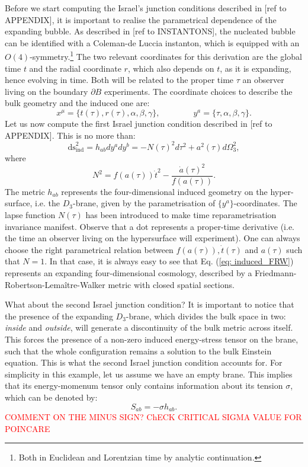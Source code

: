 \documentclass[12pt, a4paper]{article} %
\begin{document}
Before we start computing the Israel's junction conditions described in [ref to APPENDIX], it is important to realise the parametrical dependence of the expanding bubble. As described in [ref to INSTANTONS], the nucleated bubble can be identified with a Coleman-de Luccia instanton, which is equipped with an $O(4)$-symmetry.\footnote{Both in Euclidean and Lorentzian time by analytic continuation.} The two relevant coordinates for this derivation are the global time $t$ and the radial coordinate $r$, which also depends on $t$, as it is expanding, hence evolving in time. Both will be related to the proper time $\tau$ an observer living on the boundary $\partial B$ experiments. The coordinate choices to describe the bulk geometry and the induced one are:
\begin{equation}\label{eq: coordinates}
	x^{\mu} = \{t(\tau), r(\tau), \alpha, \beta, \gamma \}, \qquad \qquad  y^{a} = \{\tau, \alpha, \beta, \gamma\}.
\end{equation}
Let us now compute the first Israel junction condition described in [ref to APPENDIX]. This is no more than:
\begin{equation}\label{eq: induced_FRW}
	\text{ds}^{2}_{\text{ind}} = h_{ab} dy^{a} dy^{b} =  -N(\tau)^{2}d\tau^{2} + a^{2}(\tau) d\Omega_{3}^{2},
\end{equation}
where
\begin{equation}\label{eq: lapse_func}
	N^{2} = f(a(\tau)) \dot{t}^{2} - \frac{\dot{a}(\tau)^{2}}{f(a(\tau))}.
\end{equation}
The metric $h_{ab}$ represents the four-dimensional induced geometry on the hyper-surface, i.e. the $D_{3}$-brane, given by the parametrisation of $\{y^{a}\}$-coordinates. The lapse function $N(\tau)$ has been introduced to make time reparametrisation invariance manifest. Observe that a dot represents a proper-time derivative (i.e. the time an observer living on the hypersurface will experiment). One can always choose the right parametrical relation between $f(a(\tau)), \dot{t}(\tau)$ and $a(\tau)$ such that $N=1$. In that case, it is always easy to see that Eq. (\ref{eq: induced_FRW}) represents an expanding four-dimensional cosmology, described by a Friedmann-Robertson-Lemaître-Walker metric with closed spatial sections. 

What about the second Israel junction condition? It is important to notice that the presence of the expanding $D_{3}$-brane, which divides the bulk space in two: \textit{inside} and \textit{outside}, will generate a discontinuity of the bulk metric across itself. This forces the presence of a non-zero induced energy-stress tensor on the brane, such that the whole configuration remains a solution to the bulk Einstein equation. This is what the second Israel junction condition accounts for. For simplicity in this example, let us assume we have an empty brane. This implies that its energy-momenum tensor only contains information about its tension $\sigma$, which can be denoted by:
\begin{equation}\label{eq: simple_second_junc}
	S_{ab} = - \sigma h_{ab}.
\end{equation}
\textcolor{red}{COMMENT ON THE MINUS SIGN? ChECK CRITICAL SIGMA VALUE FOR POINCARE}
\end{document}
